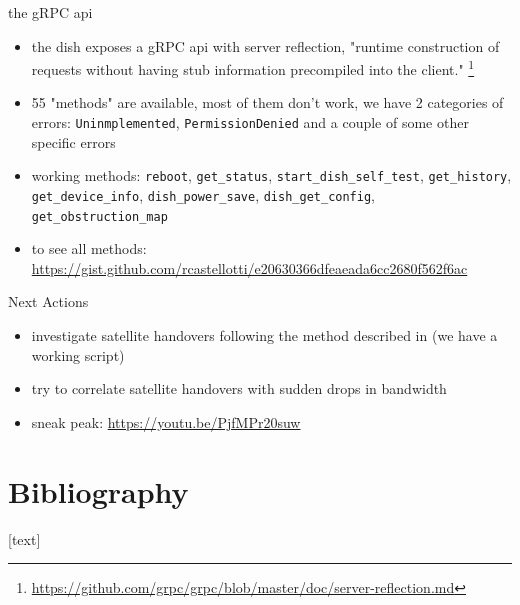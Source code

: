 \documentclass[NET,english,beameralt]{tumbeamer}
\begin{document}
\begin{frame}{the gRPC api}
\begin{itemize}
    \item the dish exposes a gRPC api with server reflection, "runtime construction of requests without having stub information precompiled into the client." \footnote{\href{https://github.com/grpc/grpc/blob/master/doc/server-reflection.md}{https://github.com/grpc/grpc/blob/master/doc/server-reflection.md}}
    \item 55 "methods" are available, most of them don't work, we have 2 categories of errors: \texttt{Uninmplemented}, \texttt{PermissionDenied} and a couple of some other specific errors 
    \item working methods: \texttt{reboot}, \texttt{get\_status}, \texttt{start\_dish\_self\_test}, \texttt{get\_history}, \texttt{get\_device\_info}, \texttt{dish\_power\_save}, \texttt{dish\_get\_config}, \texttt{get\_obstruction\_map}
    \item to see all methods: \href{https://gist.github.com/rcastellotti/e20630366dfeaeada6cc2680f562f6ac}{https://gist.github.com/rcastellotti/e20630366dfeaeada6cc2680f562f6ac}
\end{itemize}
\end{frame}

\begin{frame}{Next Actions}
\begin{itemize}
    \item investigate satellite handovers following the method described in \cite{izhikevich2023democratizing} (we have a working script)
    \item try to correlate satellite handovers with sudden drops in bandwidth
    \item sneak peak: \href{https://youtu.be/PjfMPr20suw}{https://youtu.be/PjfMPr20suw}
\end{itemize}
\end{frame}

\section{Bibliography}
\begin{frame}[allowframebreaks]
    
    [text]
    \footnotesize
    
\end{frame}
\end{document}
